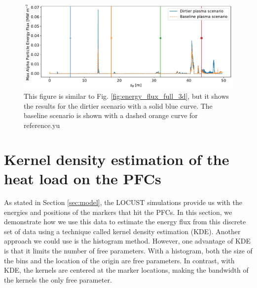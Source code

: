 \documentclass[10pt, a4paper, twoside]{article}
\begin{document}
\begin{figure}[!ht]
    \centering
    \includegraphics[width=0.99\linewidth]{Figures/energy_flux_spr_045_14_vs_spr_045_16.pdf}
    \caption{This figure is similar to Fig. \ref{fig:energy_flux_full_3d}, but it shows the results for the dirtier scenario with a solid blue curve. The baseline scenario is shown with a dashed orange curve for reference.yu}
    \label{fig:energy_flux_spr_045_14_vs_spr_045_16}
\end{figure}


\newpage
\section{Kernel density estimation of the heat load on the PFCs}
\label{appendix:kernel_density_estimation}

As stated in Section \ref{sec:model}, the LOCUST simulations provide us with the energies and positions of the markers that hit the PFCs. In this section, we demonstrate how we use this data to estimate the energy flux from this discrete set of data using a technique called kernel density estimation (KDE). Another approach we could use is the histogram method. However, one advantage of KDE is that it limits the number of free parameters. With a histogram, both the size of the bins and the location of the origin are free parameters. In contrast, with KDE, the kernels are centered at the marker locations, making the bandwidth of the kernels the only free parameter.
\end{document}
